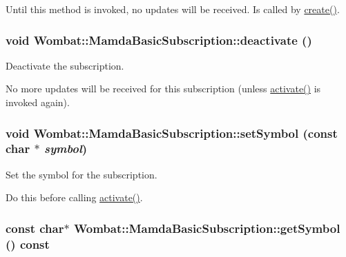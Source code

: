 Until this method is invoked, no updates will be received. Is called by \hyperlink{classWombat_1_1MamdaBasicSubscription_3c27e4c6bf7b6c23464049840aff22e0}{create()}. \hypertarget{classWombat_1_1MamdaBasicSubscription_08fea356e431659a445fa51f1771e915}{
\subsubsection[deactivate]{\setlength{\rightskip}{0pt plus 5cm}void Wombat::Mamda\-Basic\-Subscription::deactivate ()}}
\label{classWombat_1_1MamdaBasicSubscription_08fea356e431659a445fa51f1771e915}


Deactivate the subscription. 

No more updates will be received for this subscription (unless \hyperlink{classWombat_1_1MamdaBasicSubscription_704ba0b8ec4c027d0357d3e482314605}{activate()} is invoked again). \hypertarget{classWombat_1_1MamdaBasicSubscription_bf05607bd5df80605cac565166196723}{
\subsubsection[setSymbol]{\setlength{\rightskip}{0pt plus 5cm}void Wombat::Mamda\-Basic\-Subscription::set\-Symbol (const char $\ast$ {\em symbol})}}
\label{classWombat_1_1MamdaBasicSubscription_bf05607bd5df80605cac565166196723}


Set the symbol for the subscription. 

Do this before calling \hyperlink{classWombat_1_1MamdaBasicSubscription_704ba0b8ec4c027d0357d3e482314605}{activate()}. \hypertarget{classWombat_1_1MamdaBasicSubscription_70c8ddc491827feafae615113552ae0e}{
\subsubsection[getSymbol]{\setlength{\rightskip}{0pt plus 5cm}const char$\ast$ Wombat::Mamda\-Basic\-Subscription::get\-Symbol () const}}
\label{classWombat_1_1MamdaBasicSubscription_70c8ddc491827feafae615113552ae0e}


